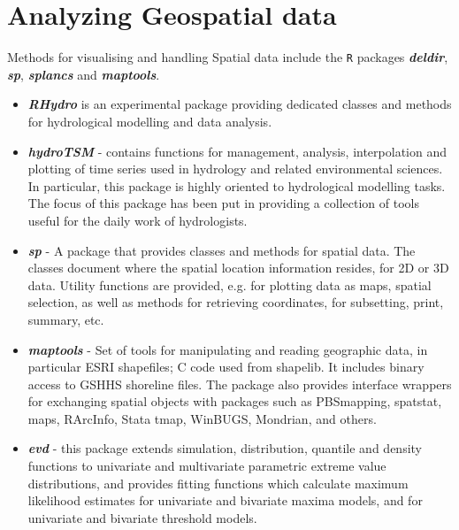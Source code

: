 \documentclass[12pt, a4paper]{article}
\theoremstyle{plain}
\theoremstyle{definition}
\theoremstyle{remark}
\begin{document}
\section{Analyzing Geospatial data}
Methods for visualising and handling Spatial data include the \texttt{R} packages \textbf{\emph{deldir}},  \textbf{\emph{sp}},  \textbf{\emph{splancs}} and \textbf{\emph{ maptools}}.



\begin{itemize}

\item \textbf{\emph{RHydro}}
 is an experimental package providing dedicated classes and methods for hydrological modelling and data analysis.

\item \textbf{\emph{hydroTSM}} - contains functions for
management, analysis, interpolation and plotting of
 time series used in hydrology and related environmental sciences.
 In particular, this package is highly oriented to hydrological modelling tasks.
 The focus of this package has been put in providing a collection of tools useful for the daily work of hydrologists.


\item \textbf{\emph{sp}} - A package that provides classes and
methods for spatial data. The classes document where the spatial
location information resides, for 2D or 3D data. Utility functions
are provided, e.g. for plotting data as maps, spatial selection,
as well as methods for retrieving coordinates, for subsetting,
print, summary, etc.

\item \textbf{\emph{maptools}} - Set of tools for manipulating and
reading geographic data, in particular ESRI shapefiles; C code
used from shapelib. It includes binary access to GSHHS shoreline
files. The package also provides interface wrappers for exchanging
spatial objects with packages such as PBSmapping, spatstat, maps,
RArcInfo, Stata tmap, WinBUGS, Mondrian, and others.

\item \textbf{\emph{evd}} - this package extends simulation,
distribution, quantile and density functions to univariate and
multivariate parametric extreme value distributions, and provides
fitting functions which calculate maximum likelihood estimates for
univariate and bivariate maxima models, and for univariate and
bivariate threshold models.



\end{itemize}
\end{document}
